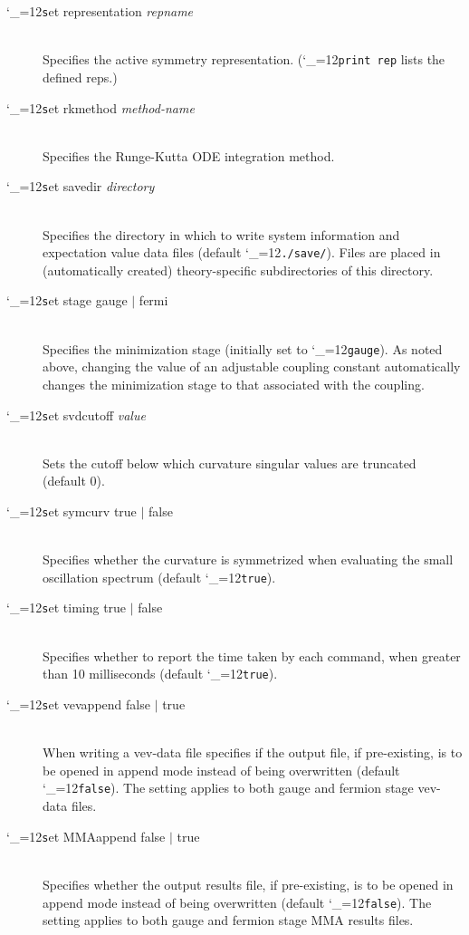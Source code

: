 \documentclass [12pt]{article}
\makeatletter
\renewcommand{\tt}{\begingroup\catcode`_=12\def\_{\string_}\tt@}
\newcommand{\tt@}[1]{\texttt{#1}\endgroup}
\makeatother
\begin{document}
\begin{description}
\item [\tt set representation {\it repname}]~\\
    Specifies the active symmetry representation.
    (\tt{print rep} lists the defined reps.)

\item [\tt set rkmethod {\it method-name}]~\\
    Specifies the Runge-Kutta ODE integration method.

\item [\tt set savedir {\it directory}]~\\
    Specifies the directory in which to write
    system information and expectation value data
    files (default \tt{./save/}).
    Files are placed in (automatically created)
    theory-specific subdirectories of this directory.

\item [\tt set stage gauge $\vert$ fermi]~\\
    Specifies the minimization stage
    (initially set to \tt{gauge}).
    As noted above,
    changing the value of an adjustable coupling constant
    automatically changes the minimization stage to that
    associated with the coupling.

\item [\tt set svdcutoff {\it value}]~\\
    Sets the cutoff below which
    curvature singular values are truncated
    (default $0$).

\item [\tt set symcurv true $\vert$ false]~\\
    Specifies whether the curvature is
    symmetrized when evaluating the
    small oscillation spectrum
    (default \tt{true}).

\item [\tt set timing true $\vert$ false]~\\
    Specifies whether to report the time taken by each command,
    when greater than 10 milliseconds
    (default \tt{true}).

\item [\tt set vevappend false $\vert$ true]~\\
    When writing a vev-data file specifies if the output file,
    if pre-existing, is to be opened in append mode
    instead of being overwritten
    (default \tt{false}).  The setting applies to both
    gauge and fermion stage vev-data files.

\item [\tt set MMAappend false $\vert$ true]~\\
    Specifies whether the output results file,
    if pre-existing, is to be opened in append mode
    instead of being overwritten
    (default \tt{false}).  The setting applies to both
    gauge and fermion stage MMA results files.


\end{description}
\end{document}
